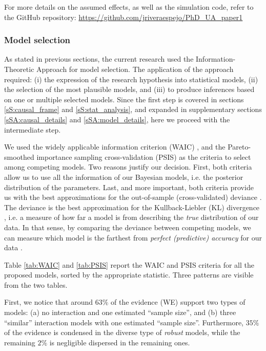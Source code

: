 For more details on the assumed effects, as well as the simulation code, refer to the GitHub repository: \url{https://github.com/jriveraespejo/PhD_UA_paper1}
%
%
\subsubsection{Model selection} \label{ssSA:model_selection}
%
As stated in previous sections, the current research used the Information-Theoretic Approach \citep{Anderson_2008, Chamberlain_1965} for model selection. The application of the approach required: (i) the expression of the research hypothesis into statistical models, (ii) the selection of the most plausible models, and (iii) to produce inferences based on one or multiple selected models. Since the first step is covered in sections \ref{sS:causal_frame} and \ref{sS:stat_analysis}, and expanded in supplementary sections \ref{sSA:causal_details} and \ref{sSA:model_details}, here we proceed with the intermediate step. 

We used the widely applicable information criterion (WAIC) \citep{Watanabe_2013}, and the Pareto-smoothed importance sampling cross-validation (PSIS) \citep{Vehtari_et_al_2021} as the criteria to select among competing models. Two reasons justify our decision. First, both criteria allow us to use all the information of our Bayesian models, i.e. the posterior distribution of the parameters. Last, and more important, both criteria provide us with the best approximations for the out-of-sample (cross-validated) deviance \citep{McElreath_2020}. The deviance is the best approximation for the Kullback-Liebler (KL) divergence \citep{Kullback_et_al_1951}, i.e. a measure of how far a model is from describing the \textit{true} distribution of our data. In that sense, by comparing the deviance between competing models, we can measure which model is the farthest from \textit{perfect (predictive) accuracy} for our data \cite{McElreath_2020}.

Table \ref{tab:WAIC} and \ref{tab:PSIS} report the WAIC and PSIS criteria for all the proposed models, sorted by the appropriate statistic. Three patterns are visible from the two tables. 

First, we notice that around $63\%$ of the evidence (WE) support two types of models: (a) no interaction and one estimated ``sample size'', and (b) three ``similar'' interaction models with one estimated ``sample size''. Furthermore, $35\%$ of the evidence is condensed in the diverse type of \textit{robust} models, while the remaining $2\%$ is negligible dispersed in the remaining ones.

